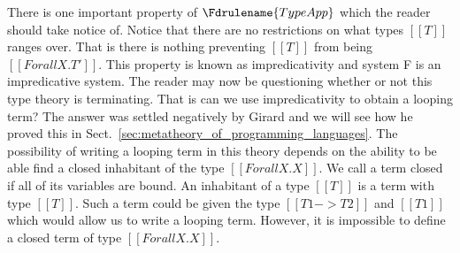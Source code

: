 There is one important property of $\Fdrulename{TypeApp}$ which the
reader should take notice of.  Notice that there are no restrictions
on what types $[[T]]$ ranges over.  That is there is nothing
preventing $[[T]]$ from being $[[Forall X.T']]$.  This property is
known as impredicativity and system F is an impredicative system.  The
reader may now be questioning whether or not this type theory is
terminating.  That is can we use impredicativity to obtain a looping
term?  The answer was settled negatively by Girard and we will see how
he proved this in Sect.~\ref{sec:metatheory_of_programming_languages}.
The possibility of writing a looping term in this theory depends on the
ability to be able find a closed inhabitant of the type 
$[[Forall X.X]]$.  We call a term closed if all of its variables are bound.
An inhabitant of a type $[[T]]$ is a term with type $[[T]]$.  Such a
term could be given the type $[[T1 -> T2]]$ and $[[T1]]$ which would
allow us to write a looping term.  However, it is impossible to define
a closed term of type $[[Forall X.X]]$.

